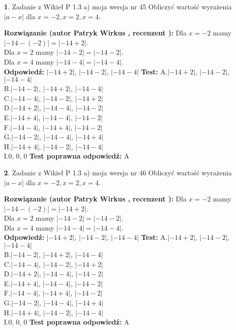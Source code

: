 \documentclass[12pt, a4paper]{article}
\theoremstyle{definition} %
\newtheorem{zad}{}
\newcommand{\zadStart}[1]{\begin{zad}#1\newline}
\newcommand{\zadStop}{\end{zad}}
\newcommand{\rozwStart}[2]{\noindent \textbf{Rozwiązanie (autor #1 , recenzent #2): }\newline}
\newcommand{\rozwStop}{\newline}
\newcommand{\odpStart}{\noindent \textbf{Odpowiedź:}\newline}
\newcommand{\odpStop}{\newline}
\newcommand{\testStart}{\noindent \textbf{Test:}\newline}
\newcommand{\testStop}{\newline}
\newcommand{\kluczStart}{\noindent \textbf{Test poprawna odpowiedź:}\newline}
\newcommand{\kluczStop}{\newline}
\begin{document}
\zadStart{Zadanie z Wikieł P 1.3 a) moja wersja nr 45}
Obliczyć wartość wyrażenia $|a - x|$ dla $x=-2,x=2,x=4$.
\zadStop
\rozwStart{Patryk Wirkus}{}
Dla $x = -2$ mamy $|-14 - (-2)| = |-14 + 2|$.\\
Dla $x = 2$ mamy $|-14 - 2| = |-14 - 2|$.\\
Dla $x = 4$ mamy $|-14 - 4| = |-14 - 4|$.\\
\rozwStop
\odpStart
$|-14 + 2|$, $|-14 - 2|$, $|-14 - 4|$
\odpStop
\testStart
A.$|-14 + 2|$, $|-14 - 2|$, $|-14 - 4|$\\
B.$|-14 - 2|$, $|-14 + 2|$, $|-14 - 4|$\\
C.$|-14 - 4|$, $|-14 - 2|$, $|-14 + 2|$\\
D.$|-14 + 2|$, $|-14 - 4|$, $|-14 - 2|$\\
E.$|-14 + 4|$, $|-14 - 4|$, $|-14 - 2|$\\
F.$|-14 - 4|$, $|-14 + 4|$, $|-14 - 2|$\\
G.$|-14 - 2|$, $|-14 - 4|$, $|-14 + 4|$\\
H.$|-14 + 4|$, $|-14 - 2|$, $|-14 - 4|$\\
I.$0$, $0$, $0$
\testStop
\kluczStart
A
\kluczStop



\zadStart{Zadanie z Wikieł P 1.3 a) moja wersja nr 46}
Obliczyć wartość wyrażenia $|a - x|$ dla $x=-2,x=2,x=4$.
\zadStop
\rozwStart{Patryk Wirkus}{}
Dla $x = -2$ mamy $|-14 - (-2)| = |-14 + 2|$.\\
Dla $x = 2$ mamy $|-14 - 2| = |-14 - 2|$.\\
Dla $x = 4$ mamy $|-14 - 4| = |-14 - 4|$.\\
\rozwStop
\odpStart
$|-14 + 2|$, $|-14 - 2|$, $|-14 - 4|$
\odpStop
\testStart
A.$|-14 + 2|$, $|-14 - 2|$, $|-14 - 4|$\\
B.$|-14 - 2|$, $|-14 + 2|$, $|-14 - 4|$\\
C.$|-14 - 4|$, $|-14 - 2|$, $|-14 + 2|$\\
D.$|-14 + 2|$, $|-14 - 4|$, $|-14 - 2|$\\
E.$|-14 + 4|$, $|-14 - 4|$, $|-14 - 2|$\\
F.$|-14 - 4|$, $|-14 + 4|$, $|-14 - 2|$\\
G.$|-14 - 2|$, $|-14 - 4|$, $|-14 + 4|$\\
H.$|-14 + 4|$, $|-14 - 2|$, $|-14 - 4|$\\
I.$0$, $0$, $0$
\testStop
\kluczStart
A
\kluczStop
\end{document}
